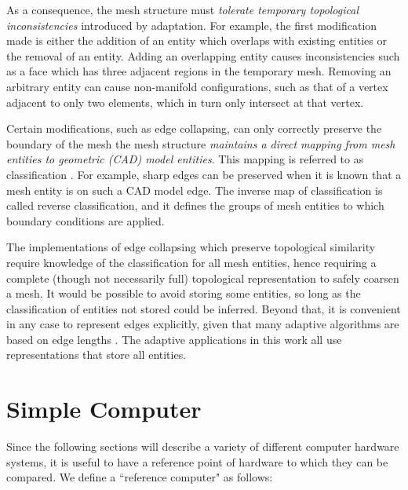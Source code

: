 As a consequence, the mesh structure must \emph{tolerate temporary
topological inconsistencies} introduced by adaptation.
For example, the first modification made is either the addition
of an entity which overlaps with existing entities
or the removal of an entity.
Adding an overlapping entity causes inconsistencies such as
a face which has three adjacent regions in the temporary mesh.
Removing an arbitrary entity can cause non-manifold configurations,
such as that of a vertex adjacent to only two elements, which
in turn only intersect at that vertex.

Certain modifications, such as edge collapsing, can only correctly
preserve the boundary of the mesh the mesh structure \emph{maintains
a direct mapping from mesh entities to geometric (CAD) model
entities}.
This mapping is referred to as classification \cite{schroeder1990combined}.
For example, sharp edges
can be preserved when it is known that a mesh entity is
on such a CAD model edge.
The inverse map of classification is called reverse
classification, and it defines the groups of mesh entities
to which boundary conditions are applied.

The implementations of edge collapsing which preserve
topological similarity require knowledge
of the classification for all mesh entities,
hence requiring a complete (though not necessarily full)
topological representation \cite{seol2006efficient}
to safely coarsen a mesh.
It would be possible to avoid storing some entities, so long
as the classification of entities not stored could be inferred.
Beyond that, it is convenient in any case to represent
edges explicitly, given that many adaptive algorithms
are based on edge lengths \cite{biswas1998tetrahedral}.
The adaptive applications in this work all use representations
that store all entities.

\section{Simple Computer}

Since the following sections will describe a variety
of different computer hardware systems, it is useful to have a reference
point of hardware to which they can be compared.
We define a ``reference computer" as follows:

